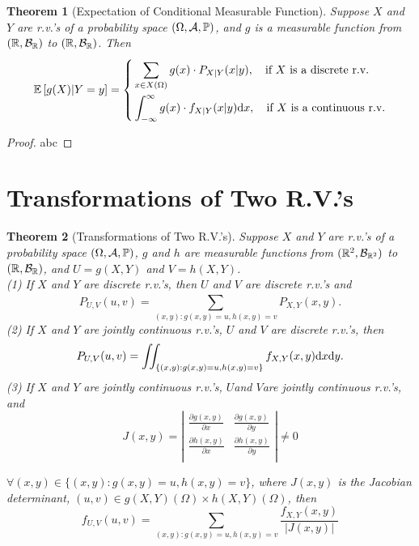 \documentclass[openany,12pt]{book}
\newtheorem{theorem}{Theorem}[chapter]
\begin{document}
\begin{theorem}[Expectation of Conditional Measurable Function]
  Suppose $X$ and $Y$ are r.v.'s of a probability space $(\Omega,\mathcal{A},\mathbb{P})$, and $g$ is a measurable function from $(\mathbb{R},\mathcal{B}_{\mathbb{R}})$ to $(\mathbb{R},\mathcal{B}_{\mathbb{R}})$. Then
  \[\mathbb{E}\left[ g(X) | Y = y \right] = \left\{ \begin{aligned}
       & \sum_{x \in X(\Omega)}^{}{g(x) \cdot P_{X|Y}(x|y),\quad \text{if }X\text{ is a discrete r.v.}}     \\
       & \int_{- \infty}^{\infty}g(x) \cdot f_{X|Y}(x|y)\mathrm{d} x,\quad\text{if }X\text{ is a continuous r.v.} \\
    \end{aligned} \right. \]
\end{theorem}

\begin{proof}
  abc
\end{proof}

\section{Transformations of Two R.V.'s}

\begin{theorem}[Transformations of Two R.V.'s]
  Suppose $X$ and $Y$ are r.v.'s of a probability space $(\Omega,\mathcal{A},\mathbb{P})$, $g$ and $h$ are measurable functions from $(\mathbb{R}^{2},\mathcal{B}_{\mathbb{R}^{2}})$ to $(\mathbb{R},\mathcal{B}_{\mathbb{R}})$, and $U = g(X,Y)$ and $V = h(X,Y)$.\\
  (1) If $X$ and $Y$ are discrete r.v.'s, then $U$ and $V$ are discrete r.v.'s and
  \[P_{U,V}(u,v)= \sum_{(x,y):g(x,y)= u,h(x,y)= v}^{}{P_{X,Y}(x,y)}.\]
  (2) If $X$ and $Y$ are jointly continuous r.v.'s, $U$ and $V$ are discrete r.v.'s, then
  \[P_{U,V}(u,v)= \iint_{\{(x,y):g(x,y)= u,h(x,y)= v\}}^{}{f_{X,Y}(x,y)\mathrm{d} x\mathrm{d} y.}\]
  (3) If $X$ and $Y$ are jointly continuous r.v.'s, $U$and $V$are jointly continuous r.v.'s, and
  \[J(x,y)= \left| \begin{matrix}
      \frac{\partial g(x,y)}{\partial x} & \frac{\partial g(x,y)}{\partial y} \\
      \frac{\partial h(x,y)}{\partial x} & \frac{\partial h(x,y)}{\partial y} \\
    \end{matrix} \right| \neq 0\]

  $\forall(x,y) \in \{(x,y):g(x,y)= u, h(x,y)= v\}$, where $J(x,y)$ is the Jacobian determinant, $(u,v) \in g(X,Y)(\Omega) \times h(X,Y)(\Omega)$, then
  \[f_{U,V}(u,v)= \sum_{(x,y):g(x,y)= u,h(x,y)= v}^{}\frac{f_{X,Y}(x,y)}{|J(x,y)|}\]
\end{theorem}
\end{document}
